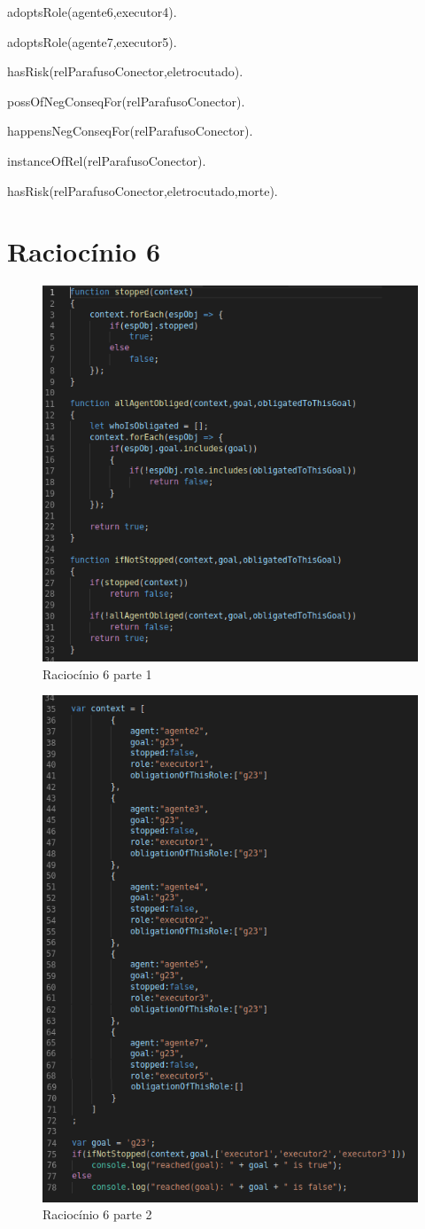 adoptsRole(agente6,executor4).

adoptsRole(agente7,executor5).

hasRisk(relParafusoConector,eletrocutado).

possOfNegConseqFor(relParafusoConector).

happensNegConseqFor(relParafusoConector).

instanceOfRel(relParafusoConector).

hasRisk(relParafusoConector,eletrocutado,morte).

\section{Raciocínio 6}


\begin{figure}[H]
  \centering
  \includegraphics[width=0.8\linewidth]{figure/algjs} 
  \caption{Raciocínio 6 parte 1}
  \label{atividiagram2}
\end{figure}


\begin{figure}[H]
  \centering
  \includegraphics[width=0.8\linewidth]{figure/algjs2} 
  \caption{Raciocínio 6 parte 2}
  \label{atividiagram2}
\end{figure}